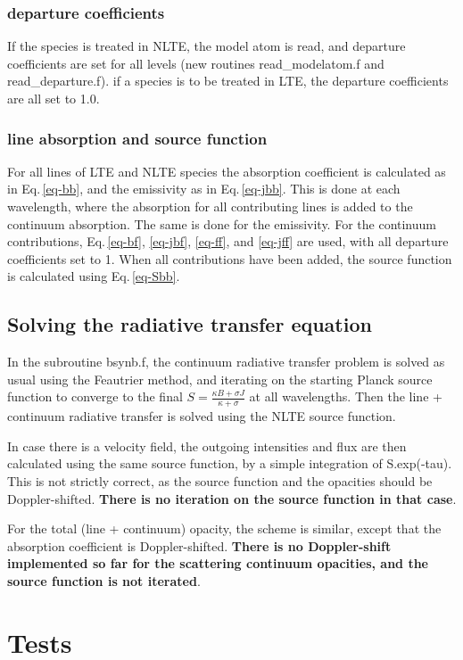 \documentclass[a4paper,12pt]{article}
\begin{document}
\subsubsection{departure coefficients}
If the species is treated in NLTE, the model atom is read, and departure coefficients
are set for all levels (new routines read\_modelatom.f and read\_departure.f). if a species is to be treated in LTE, 
the departure coefficients are all set to 1.0.

\subsubsection{line absorption and source function}
For all lines of LTE and NLTE species the absorption coefficient is calculated as in Eq.\,\ref{eq-bb}, and the emissivity 
 as in Eq.\,\ref{eq-jbb}. This is done at each wavelength, where the absorption for all
contributing lines is added to the continuum absorption. The same is done for the emissivity. 
For the continuum contributions, Eq.\,\ref{eq-bf}, \ref{eq-jbf}, \ref{eq-ff}, and \ref{eq-jff} are used, 
with all departure coefficients set to 1.
When all contributions have been added, the source function is calculated using Eq.\,\ref{eq-Sbb}.

\subsection{Solving the radiative transfer equation}
In the subroutine bsynb.f, the continuum radiative transfer problem is solved as usual using the Feautrier method,
and iterating on the starting Planck source function to converge to the final $S = \frac{\kappa B + \sigma J}{\kappa + \sigma}$
at all wavelengths. Then the line + continuum radiative transfer is solved using the NLTE source function.

In case there is a velocity field, the outgoing intensities and flux are then calculated using the same source
function, by a simple integration of S.exp(-tau). This is not strictly correct, as the source 
function and the opacities should be Doppler-shifted. {\bf There is no iteration on the source function in that case}. 

For the total (line + continuum) opacity, the scheme is similar, except that the absorption coefficient is Doppler-shifted.
{\bf There is no 
Doppler-shift implemented so far for the scattering continuum opacities, and the source function is not iterated}.

\section{Tests}
\end{document}
